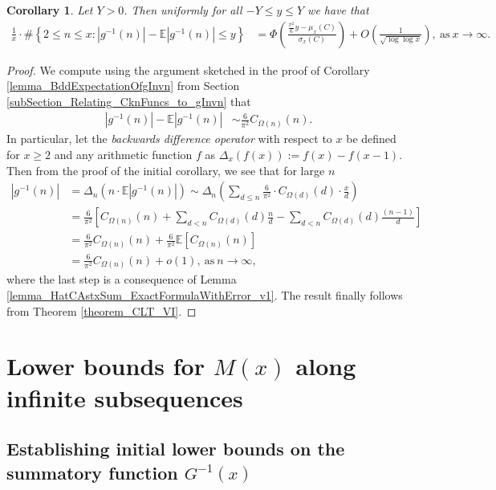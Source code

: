 \documentclass[11pt,reqno,a4letter]{article}
\numberwithin{figure}{section}
\numberwithin{table}{section}
\theoremstyle{plain}
\newtheorem{cor}[theorem]{Corollary}
\numberwithin{theorem}{section}
\theoremstyle{definition}
\begin{document}
\begin{cor} 
\label{cor_CLT_VII} 
Let $Y > 0$. 
Then uniformly for all $-Y \leq y \leq Y$ 
we have that 
\begin{align*} 
\frac{1}{x} \cdot \#\left\{2 \leq n \leq x:|g^{-1}(n)| - 
     \mathbb{E}|g^{-1}(n)| \leq y\right\} & = 
     \Phi\left(\frac{\frac{\pi^2}{6} y - \mu_x(C)}{\sigma_x(C)}\right) + 
     O\left(\frac{1}{\sqrt{\log\log x}}\right), 
     \mathrm{\ as\ } x \rightarrow \infty. 
\end{align*} 
\end{cor} 
\begin{proof} 
We compute using the argument sketched in the proof of 
Corollary \ref{lemma_BddExpectationOfgInvn} from 
Section \ref{subSection_Relating_CknFuncs_to_gInvn} that 
\begin{align*} 
|g^{-1}(n)| - \mathbb{E}|g^{-1}(n)| & \sim \frac{6}{\pi^2} C_{\Omega(n)}(n). 
\end{align*} 
In particular, let the \emph{backwards difference operator} with respect to $x$ 
be defined for $x \geq 2$ and any arithmetic function $f$ as 
$\Delta_x(f(x)) := f(x) - f(x-1)$. Then from the proof of the initial corollary, 
we see that for large $n$ 
\begin{align*} 
|g^{-1}(n)| & = \Delta_n(n \cdot \mathbb{E}|g^{-1}(n)|) 
     \sim \Delta_n\left(\sum_{d \leq n} \frac{6}{\pi^2} \cdot C_{\Omega(d)}(d) \cdot \frac{x}{d}\right) \\ 
     & = \frac{6}{\pi^2}\left[C_{\Omega(n)}(n) + \sum_{d < n} C_{\Omega(d)}(d) \frac{n}{d} - 
     \sum_{d<n} C_{\Omega(d)}(d) \frac{(n-1)}{d}\right] \\ 
     & = \frac{6}{\pi^2} C_{\Omega(n)}(n) + \frac{6}{\pi^2} \mathbb{E}[C_{\Omega(n)}(n)] \\ 
     & = \frac{6}{\pi^2} C_{\Omega(n)}(n) + o(1), 
     \mathrm{\ as\ } n \rightarrow \infty, 
\end{align*} 
where the last step is a consequence of 
Lemma \ref{lemma_HatCAstxSum_ExactFormulaWithError_v1}. 
The result finally follows from Theorem \ref{theorem_CLT_VI}. 
\end{proof} 

\newpage 
\section{Lower bounds for $M(x)$ along infinite subsequences} 
\label{Section_KeyApplications} 

\subsection{Establishing initial lower bounds on the summatory function $G^{-1}(x)$} 
\label{Section_ProofOfValidityOfAverageOrderLowerBounds} 
\end{document}
